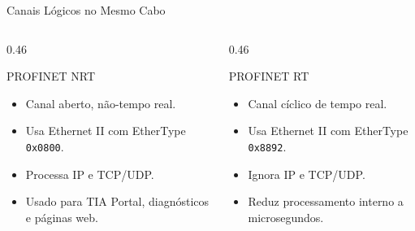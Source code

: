\documentclass[10pt, aspectratio=169]{beamer}
\begin{document}
\begin{frame}{Canais L\'ogicos no Mesmo Cabo}
    \small
    \begin{columns}[T,totalwidth=\textwidth]
        \begin{column}{0.46\textwidth}
            \begin{block}{PROFINET NRT}
                \begin{itemize}
                    \item Canal aberto, n\~ao-tempo real.
                    \item Usa Ethernet II com EtherType \texttt{0x0800}.
                    \item Processa IP e TCP/UDP.
                    \item Usado para TIA Portal, diagn\'osticos e p\'aginas web.
                \end{itemize}
            \end{block}
        \end{column}
        \begin{column}{0.46\textwidth}
            \begin{block}{PROFINET RT}
                \begin{itemize}
                    \item Canal c\'iclico de tempo real.
                    \item Usa Ethernet II com \alert{EtherType \texttt{0x8892}}.
                    \item Ignora IP e TCP/UDP.
                    \item Reduz processamento interno a microsegundos.
                \end{itemize}
            \end{block}
        \end{column}
    \end{columns}
\end{frame}
\end{document}
